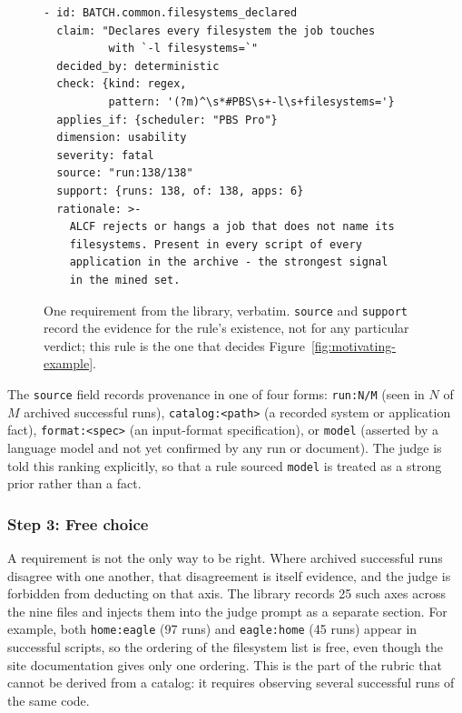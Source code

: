 \documentclass[conference]{IEEEtran}
\begin{document}
\begin{figure}[t]
\begin{Verbatim}[fontsize=\scriptsize,frame=single,framesep=2mm]
- id: BATCH.common.filesystems_declared
  claim: "Declares every filesystem the job touches
          with `-l filesystems=`"
  decided_by: deterministic
  check: {kind: regex,
          pattern: '(?m)^\s*#PBS\s+-l\s+filesystems='}
  applies_if: {scheduler: "PBS Pro"}
  dimension: usability
  severity: fatal
  source: "run:138/138"
  support: {runs: 138, of: 138, apps: 6}
  rationale: >-
    ALCF rejects or hangs a job that does not name its
    filesystems. Present in every script of every
    application in the archive - the strongest signal
    in the mined set.
\end{Verbatim}
\caption{One requirement from the library, verbatim. \texttt{source} and
\texttt{support} record the evidence for the rule's existence, not for any
particular verdict; this rule is the one that decides
Figure~\ref{fig:motivating-example}.}
\label{fig:requirement-yaml}
\end{figure}

The \texttt{source} field records provenance in one of four forms: \texttt{run:N/M} (seen in $N$ of $M$ archived successful runs), \texttt{catalog:\textless path\textgreater} (a recorded system or application fact), \texttt{format:\textless spec\textgreater} (an input-format specification), or \texttt{model} (asserted by a language model and not yet confirmed by any run or document). The judge is told this ranking explicitly, so that a rule sourced \texttt{model} is treated as a strong prior rather than a fact.

\subsubsection{Step 3: Free choice}
A requirement is not the only way to be right. Where archived successful runs disagree with one another, that disagreement is itself evidence, and the judge is forbidden from deducting on that axis. The library records 25 such axes across the nine files and injects them into the judge prompt as a separate section. For example, both \texttt{home:eagle} (97 runs) and \texttt{eagle:home} (45 runs) appear in successful scripts, so the ordering of the filesystem list is free, even though the site documentation gives only one ordering. This is the part of the rubric that cannot be derived from a catalog: it requires observing several successful runs of the same code.
\end{document}

